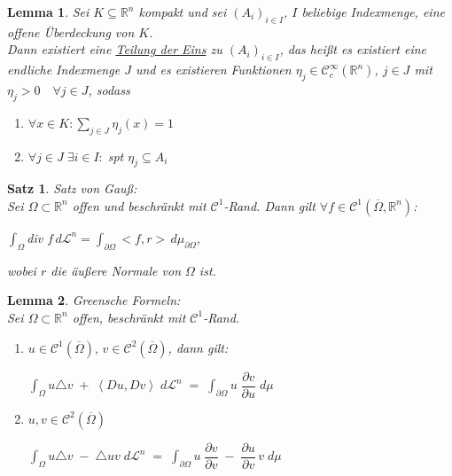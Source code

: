 \documentclass[11pt]{memoir}
\theoremstyle{changebreak}
\newtheorem{Lemma}{Lemma}[chapter]
\newtheorem{Satz}{Satz}[chapter]
\newcommand{\dom}{\partial\Omega}
\newcommand{\oo}{\overline{\Omega}}
\begin{document}
\begin{Lemma}
Sei $K \subseteq \mathbb R^n$ kompakt und sei $(A_i)_{i \in I}$, $I$ beliebige Indexmenge, eine offene Überdeckung von $K$. \\
Dann existiert eine \underline{Teilung der Eins} zu $(A_i)_{i \in I}$, das heißt es existiert eine endliche Indexmenge $J$ und es existieren Funktionen $\eta_j \in \mathscr C_c^\infty(\mathbb R^n)$, $j \in J$ mit $\eta_j > 0 \quad \forall j \in J$, sodass
\begin{enumerate}
	\item $\forall x \in K: \sum\limits_{j \in J} \eta_j(x) =1$
	\item $\forall j \in J \; \exists i \in I: \; $spt $ \eta_j \subseteq A_i$
\end{enumerate}
\end{Lemma}


\begin{Satz}
\emph{Satz von Gauß}: \\
Sei $\Omega \subset \mathbb R^n$ offen und beschränkt mit $\mathscr C^1$-Rand. Dann gilt $\forall f \in \mathscr C^1(\overline \Omega, \mathbb R^n)$:
\begin{center}
	$\int_\Omega $div $f\, d\mathscr L^n = \int_{\dom} <f, r> \, d\mu_{\dom}$,
\end{center}
wobei $r$ die äußere Normale von $\Omega$ ist.
\end{Satz}



\begin{Lemma}
\emph{Greensche Formeln}: \\
Sei $\Omega \subset \mathbb R^n$ offen, beschränkt mit $\mathscr C^1$-Rand.
\begin{enumerate}
	\item $u \in \mathscr C^1(\overline{\Omega}), \, v \in \mathscr C^2(\oo)$, dann gilt:
	\begin{center}
		$\int_\Omega u \triangle v \; + \; \left\langle Du, Dv \right\rangle \; d\mathscr L^n \; = \; \int_{\dom} u \;\dfrac{\partial v}{\partial u}\; d\mu$
	\end{center}
	\item $u, v \in \mathscr C^2(\oo)$
	\begin{center}
		$\int_\Omega u \triangle v \; - \; \triangle u v \; d\mathscr L^n \; = \; \int_{\dom} u \; \dfrac{\partial v}{\partial v} \; - \; \dfrac{\partial u}{\partial v} \, v \; d\mu$
	\end{center}
\end{enumerate}
\end{Lemma}
\end{document}
